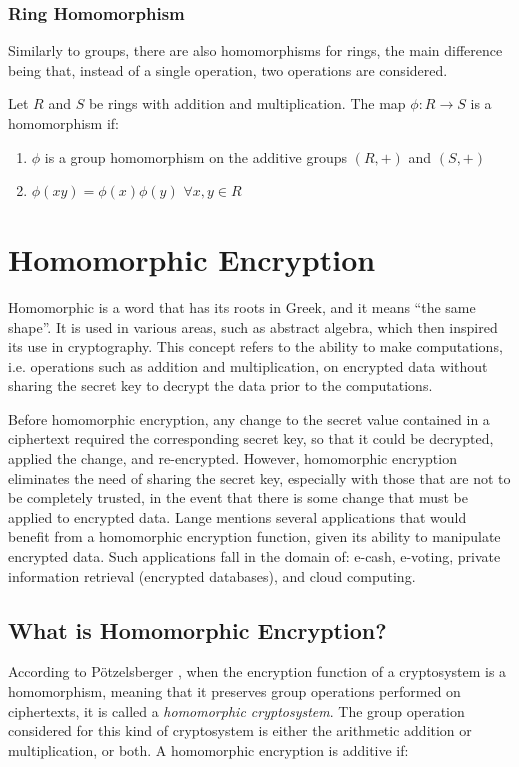 \subsubsection{Ring Homomorphism}

Similarly to groups, there are also homomorphisms for rings, the main difference being that, instead of a single operation, two operations are considered.

Let $R$ and $S$ be rings with addition and multiplication. The map $\phi: R \rightarrow S$ is a homomorphism if:
\begin{enumerate}
\item $\phi$ is a group homomorphism on the additive groups $(R, +)$ and $(S,+)$
\item $\phi(xy) = \phi(x) \phi(y)$ $\forall x, y \in R$
\end{enumerate}

\section{Homomorphic Encryption}

Homomorphic is a word that has its roots in Greek, and it means ``the same shape''. It is used in various areas, such as abstract algebra, which then inspired its use in cryptography. This concept refers to the ability to make computations, i.e. operations such as addition and multiplication, on encrypted data without sharing the secret key to decrypt the data prior to the computations. 

Before homomorphic encryption, any change to the secret value contained in a ciphertext required the corresponding secret key, so that it could be decrypted, applied the change, and re-encrypted. However, homomorphic encryption eliminates the need of sharing the secret key, especially with those that are not to be completely trusted, in the event that there is some change that must be applied to encrypted data. 
Lange \cite{lange2011} mentions several applications that would benefit from a homomorphic encryption function, given its ability to manipulate encrypted data. Such applications fall in the domain of: e-cash, e-voting, private information retrieval (encrypted databases), and cloud computing.

\subsection{What is Homomorphic Encryption?}
According to P{\"o}tzelsberger \cite{potzelsberger2013kv}, when the encryption function of a cryptosystem is a homomorphism, meaning that it preserves group operations performed on ciphertexts, it is called a \emph{homomorphic cryptosystem}. The group operation considered for this kind of cryptosystem is either the arithmetic addition or multiplication, or both. A homomorphic encryption is additive if:

